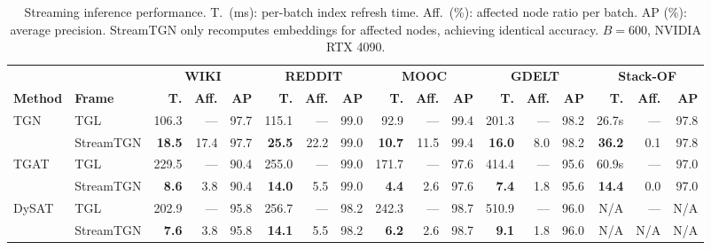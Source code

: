 \begin{table}[t]
\centering
\caption{Streaming inference performance. T.\ (ms): per-batch index refresh time. Aff.\ (\%): affected node ratio per batch. AP (\%): average precision. StreamTGN only recomputes embeddings for affected nodes, achieving identical accuracy. $B{=}600$, NVIDIA RTX 4090.}
\label{tab:main_results}
\setlength{\tabcolsep}{3pt}
\small
\begin{tabular}{ll|rrr|rrr|rrr|rrr|rrr}
\toprule
 &  & \multicolumn{3}{c|}{\textbf{WIKI}} & \multicolumn{3}{c|}{\textbf{REDDIT}} & \multicolumn{3}{c|}{\textbf{MOOC}} & \multicolumn{3}{c|}{\textbf{GDELT}} & \multicolumn{3}{c}{\textbf{Stack-OF}} \\
\cmidrule(lr){3-5}\cmidrule(lr){6-8}\cmidrule(lr){9-11}\cmidrule(lr){12-14}\cmidrule(lr){15-17}
\textbf{Method} & \textbf{Frame} & \textbf{T.} & \textbf{Aff.} & \textbf{AP} & \textbf{T.} & \textbf{Aff.} & \textbf{AP} & \textbf{T.} & \textbf{Aff.} & \textbf{AP} & \textbf{T.} & \textbf{Aff.} & \textbf{AP} & \textbf{T.} & \textbf{Aff.} & \textbf{AP} \\
\midrule
TGN & TGL & 106.3 & --- & 97.7 & 115.1 & --- & 99.0 & 92.9 & --- & 99.4 & 201.3 & --- & 98.2 & 26.7s & --- & 97.8 \\
 & StreamTGN & \textbf{18.5} & 17.4 & 97.7 & \textbf{25.5} & 22.2 & 99.0 & \textbf{10.7} & 11.5 & 99.4 & \textbf{16.0} & 8.0 & 98.2 & \textbf{36.2} & 0.1 & 97.8 \\
\midrule
TGAT & TGL & 229.5 & --- & 90.4 & 255.0 & --- & 99.0 & 171.7 & --- & 97.6 & 414.4 & --- & 95.6 & 60.9s & --- & 97.0 \\
 & StreamTGN & \textbf{8.6} & 3.8 & 90.4 & \textbf{14.0} & 5.5 & 99.0 & \textbf{4.4} & 2.6 & 97.6 & \textbf{7.4} & 1.8 & 95.6 & \textbf{14.4} & 0.0 & 97.0 \\
\midrule
DySAT & TGL & 202.9 & --- & 95.8 & 256.7 & --- & 98.2 & 242.3 & --- & 98.7 & 510.9 & --- & 96.0 & N/A & --- & N/A \\
 & StreamTGN & \textbf{7.6} & 3.8 & 95.8 & \textbf{14.1} & 5.5 & 98.2 & \textbf{6.2} & 2.6 & 98.7 & \textbf{9.1} & 1.8 & 96.0 & N/A & N/A & N/A \\
\midrule
\bottomrule
\end{tabular}
\end{table}